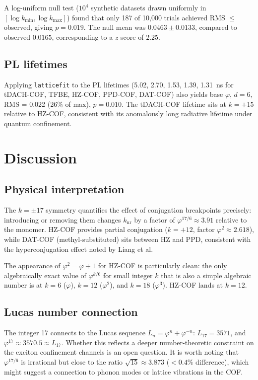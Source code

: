 \documentclass[11pt,a4paper]{article}
\begin{document}
A log-uniform null test ($10^4$ synthetic datasets drawn uniformly
in $[\log k_{\min}, \log k_{\max}]$) found that only 187 of 10,000
trials achieved RMS $\leq$ observed, giving $p = 0.019$.
The null mean was $0.0463 \pm 0.0133$, compared to observed
$0.0165$, corresponding to a $z$-score of $2.25$.

\subsection{PL lifetimes}

Applying \texttt{latticefit} to the PL lifetimes (5.02, 2.70, 1.53,
1.39, 1.31~ns for tDACH-COF, TFBE, HZ-COF, PPD-COF, DAT-COF)
also yields base $\varphi$, $d = 6$, RMS = 0.022 (26\% of max),
$p = 0.010$. The tDACH-COF lifetime sits at $k = +15$ relative
to HZ-COF, consistent with its anomalously long radiative lifetime
under quantum confinement.

\section{Discussion}

\subsection{Physical interpretation}

The $k = \pm 17$ symmetry quantifies the effect of conjugation
breakpoints precisely: introducing or removing them changes
$k_{\mathrm{nr}}$ by a factor of $\varphi^{17/6} \approx 3.91$
relative to the monomer. HZ-COF provides partial conjugation
($k = +12$, factor $\varphi^2 \approx 2.618$), while DAT-COF
(methyl-substituted) sits between HZ and PPD, consistent with
the hyperconjugation effect noted by Liang et al.

The appearance of $\varphi^2 = \varphi + 1$ for HZ-COF is
particularly clean: the only algebraically exact value of
$\varphi^{k/6}$ for small integer $k$ that is also a simple
algebraic number is at $k = 6$ ($\varphi$), $k = 12$ ($\varphi^2$),
and $k = 18$ ($\varphi^3$). HZ-COF lands at $k = 12$.

\subsection{Lucas number connection}

The integer 17 connects to the Lucas sequence
$L_n = \varphi^n + \varphi^{-n}$: $L_{17} = 3571$, and
$\varphi^{17} \approx 3570.5 \approx L_{17}$. Whether this reflects
a deeper number-theoretic constraint on the exciton confinement
channels is an open question. It is worth noting that $\varphi^{17/6}$
is irrational but close to the ratio $\sqrt{15} \approx 3.873$
($< 0.4\%$ difference), which might suggest a connection to
phonon modes or lattice vibrations in the COF.
\end{document}
